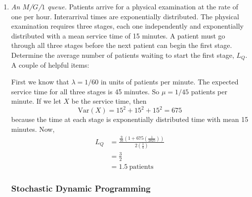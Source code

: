 \begin{enumerate}
\item \emph{An $M$/$G$/$1$ queue.}  Patients arrive for a physical
  examination at the rate of one per hour. Interarrival times are
  exponentially distributed. The physical examination requires three
  stages, each one independently and exponentially distributed with a
  mean service time of 15 minutes. A patient must go through all three
  stages before the next patient can begin the first stage. Determine
  the average number of patients waiting to start the first stage,
  $L_Q$. A couple of helpful items: 

\begin{solution}
  \bs First we know that $\lambda = 1/60$ in units of patients per
  minute. The expected service time for all three stages is 45
  minutes. So $\mu = 1/45$ patients per minute. If we let $X$ be the
  service time, then
  \[ \text{Var}(X) = 15^2 + 15^2 + 15^2 = 675 \] because the time at
  each stage is exponentially distributed time with mean 15 minutes.
  Now,
\begin{align*}
  L_Q &= \frac{\frac{9}{16}\left(1 + 675\left(\frac{1}{2025}\right)\right)}{2\left(\frac{1}{4}\right)} \\
      &= \frac{3}{2} \\
      &= 1.5 ~\text{patients}
\end{align*}
\end{solution}

\subsubsection*{Stochastic Dynamic Programming}


\end{enumerate}
